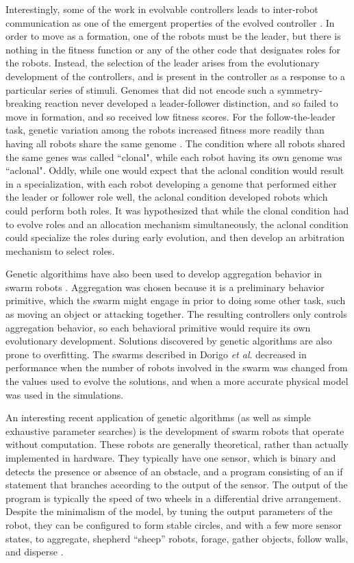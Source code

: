 Interestingly, some of the work in evolvable controllers leads to inter-robot communication as one of the emergent properties of the evolved controller \citep{quinn2001evolving}.
In order to move as a formation, one of the robots must be the leader, but there is nothing in the fitness function or any of the other code that designates roles for the robots. 
Instead, the selection of the leader arises from the evolutionary development of the controllers, and is present in the controller as a response to a particular series of stimuli. 
Genomes that did not encode such a symmetry-breaking reaction never developed a leader-follower distinction, and so failed to move in formation, and so received low fitness scores. 
For the follow-the-leader task, genetic variation among the robots increased fitness more readily than having all robots share the same genome \citep{quinn2001comparison}.
The condition where all robots shared the same genes was called ``clonal", while each robot having its own genome was ``aclonal".
Oddly, while one would expect that the aclonal condition would result in a specialization, with each robot developing a genome that performed either the leader or follower role well, the aclonal condition developed robots which could perform both roles. 
It was hypothesized that while the clonal condition had to evolve roles and an allocation mechanism simultaneously, the aclonal condition could specialize the roles during early evolution, and then develop an arbitration mechanism to select roles.

Genetic algorithims have also been used to develop aggregation behavior in swarm robots \citep{bahgecci2005evolving, dorigo2004evolving}.  
Aggregation was chosen because it is a preliminary behavior primitive, which the swarm might engage in prior to doing some other task, such as moving an object or attacking together.
The resulting controllers only controls aggregation behavior, so each behavioral primitive would require its own evolutionary development. 
Solutions discovered by genetic algorithms are also prone to overfitting. 
The swarms described in Dorigo \emph{et al}. decreased in performance when the number of robots involved in the swarm was changed from the values used to evolve the solutions, and when a more accurate physical model was used in the simulations.

An interesting recent application of genetic algorithms (as well as simple exhaustive parameter searches) is the development of swarm robots that operate without computation. 
These robots are generally theoretical, rather than actually implemented in hardware. 
They typically have one sensor, which is binary and detects the presence or absence of an obstacle, and a program consisting of an if statement that branches according to the output of the sensor. 
The output of the program is typically the speed of two wheels in a differential drive arrangement.
Despite the minimalism of the model, by tuning the output parameters of the robot, they can be configured to form stable circles, and with a few more sensor states, to aggregate, shepherd ``sheep'' robots, forage, gather objects, follow walls, and disperse \citep{gauci2014self, johnson2016evolving, ozdemir2017shepherding, brown2018discovery, stcircle}. 

